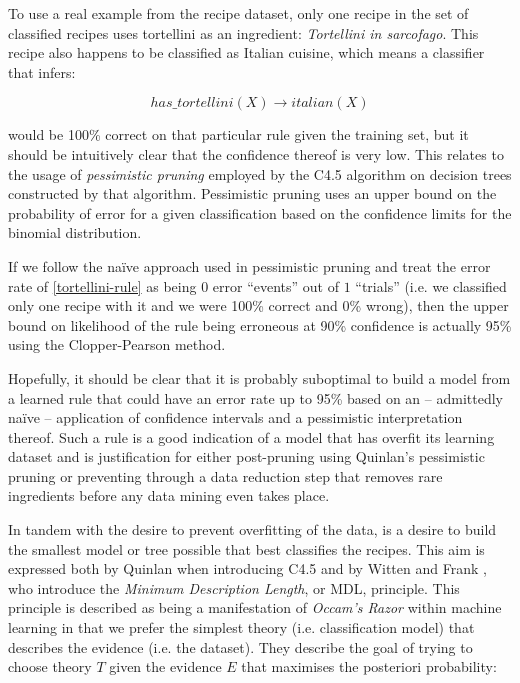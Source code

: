 \documentclass[11pt,a4paper]{article}
\begin{document}
To use a real example from the recipe dataset, only one recipe in the set of
classified recipes uses tortellini as an ingredient: \emph{Tortellini in sarcofago}.
This recipe also happens to be classified as Italian cuisine, which means a classifier
that infers:

\begin{equation} \label{tortellini-rule}
has\_tortellini(X) \to italian(X)
\end{equation}

\noindent would be 100\% correct on that particular
rule given the training set, but it should be intuitively clear that the confidence
thereof is very low. This relates to the usage of \emph{pessimistic pruning} employed
by the C4.5 algorithm \cite{quinlan1993c4} on decision trees constructed by that algorithm.
Pessimistic pruning uses an upper bound on the probability of error for a given classification
based on the confidence limits for the binomial distribution.

If we follow the na\"ive approach used in pessimistic pruning and treat the error rate
of \eqref{tortellini-rule} as being $0$ error ``events'' out of $1$ ``trials'' (i.e.
we classified only one recipe with it and we were 100\% correct and 0\% wrong), then
the upper bound on likelihood of the rule being erroneous at 90\% confidence is
actually 95\% using the Clopper-Pearson method. \cite{clopper1934use}

Hopefully, it should be clear that it is probably suboptimal to build a model from
a learned rule that could
have an error rate up to 95\% based on an -- admittedly na\"ive -- application of
confidence intervals and a pessimistic interpretation thereof.
Such a rule is a good indication of a model that has overfit
its learning dataset and is justification for either post-pruning using Quinlan's
pessimistic pruning or preventing through a data reduction step that removes rare
ingredients before any data mining even takes place.

In tandem with the desire to prevent overfitting of the data, is a desire to build
the smallest model or tree possible that best classifies the recipes. This
aim is expressed both by Quinlan when introducing C4.5 \cite{quinlan1993c4}
and by Witten and Frank \cite{witten2011data}, who introduce the
\emph{Minimum Description Length}, or MDL, principle. This principle is
described as being a manifestation of \emph{Occam's Razor} within machine learning
in that we prefer the simplest theory (i.e. classification model) that describes
the evidence (i.e. the dataset). They describe the goal of trying to choose
theory $T$ given the evidence $E$ that maximises the posteriori probability:
\end{document}
